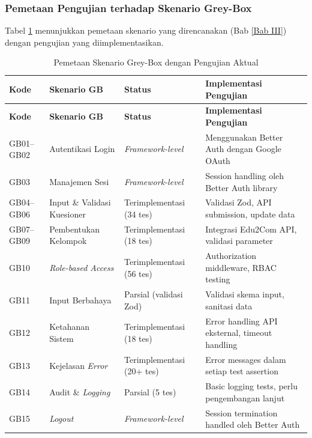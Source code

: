 \subsubsection{Pemetaan Pengujian terhadap Skenario Grey-Box}

Tabel \ref{tab:gb-scenario-mapping} menunjukkan pemetaan skenario yang direncanakan (Bab \ref{Bab III}) dengan pengujian yang diimplementasikan.

\begin{longtable}{|p{}|p{}|p{}|p{}|}
	\caption{Pemetaan Skenario Grey-Box dengan Pengujian Aktual}
	\label{tab:gb-scenario-mapping}                                                                                          \\
	\hline
	\textbf{Kode} & \textbf{Skenario GB}        & \textbf{Status}           & \textbf{Implementasi Pengujian}                \\
	\hline
	\endfirsthead
	\hline
	\textbf{Kode} & \textbf{Skenario GB}        & \textbf{Status}           & \textbf{Implementasi Pengujian}                \\
	\hline
	\endhead
	\hline
	\endfoot
	\hline
	\endlastfoot
	GB01--GB02    & Autentikasi Login           & \textit{Framework-level}  & Menggunakan Better Auth dengan Google OAuth    \\
	\hline
	GB03          & Manajemen Sesi              & \textit{Framework-level}  & Session handling oleh Better Auth library      \\
	\hline
	GB04--GB06    & Input \& Validasi Kuesioner & Terimplementasi (34 tes)  & Validasi Zod, API submission, update data      \\
	\hline
	GB07--GB09    & Pembentukan Kelompok        & Terimplementasi (18 tes)  & Integrasi Edu2Com API, validasi parameter      \\
	\hline
	GB10          & \textit{Role-based Access}  & Terimplementasi (56 tes)  & Authorization middleware, RBAC testing         \\
	\hline
	GB11          & Input Berbahaya             & Parsial (validasi Zod)    & Validasi skema input, sanitasi data            \\
	\hline
	GB12          & Ketahanan Sistem            & Terimplementasi (18 tes)  & Error handling API eksternal, timeout handling \\
	\hline
	GB13          & Kejelasan \textit{Error}    & Terimplementasi (20+ tes) & Error messages dalam setiap test assertion     \\
	\hline
	GB14          & Audit \& \textit{Logging}   & Parsial (5 tes)           & Basic logging tests, perlu pengembangan lanjut \\
	\hline
	GB15          & \textit{Logout}             & \textit{Framework-level}  & Session termination handled oleh Better Auth   \\
	\hline
\end{longtable}



